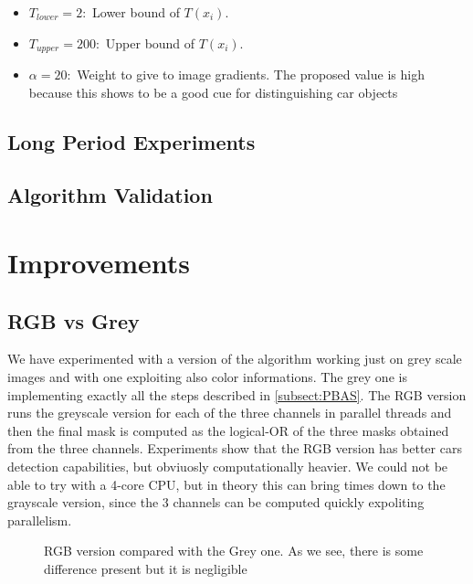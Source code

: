 \begin{itemize}
\item $T_{lower}= 2:$ Lower bound of $T(x_i)$.
\item $T_{upper}= 200:$ Upper bound of $T(x_i)$.
\item $\alpha = 20:$ Weight to give to image gradients. The proposed value is high because this shows to be a good cue for distinguishing car objects
\end{itemize} 

\subsection{Long Period Experiments}

\subsection{Algorithm Validation}

\section*{Improvements}

\subsection*{RGB vs Grey}
We have experimented with a version of the algorithm working just on grey scale images and with one exploiting also color informations. The grey one is implementing exactly all the steps described in \ref{subsect:PBAS}. The RGB version runs the greyscale version for each of the three channels in parallel threads and then the final mask is computed as the logical-OR of the three masks obtained from the three channels.
Experiments show that the RGB version has better cars detection capabilities, but obviuosly computationally heavier. We could not be able to try with a 4-core CPU, but in theory this can bring times down to the grayscale version, since the 3 channels can be computed quickly expoliting parallelism.

\begin{figure}[!t]
    \centering
    \newline
	\caption{RGB version compared with the Grey one. As we see, there is some difference present but it is negligible}
\end{figure}

